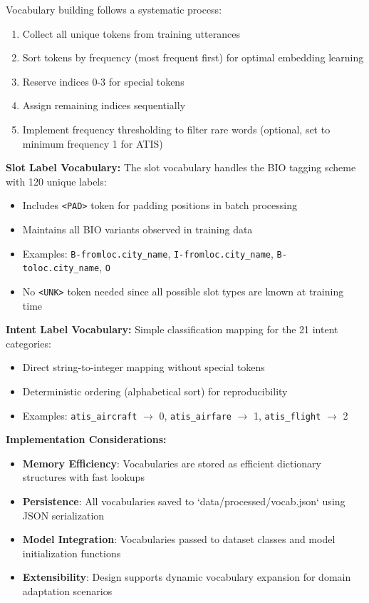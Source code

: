 \documentclass[conference]{IEEEtran}
\begin{document}
Vocabulary building follows a systematic process:
\begin{enumerate}
  \item Collect all unique tokens from training utterances
  \item Sort tokens by frequency (most frequent first) for optimal embedding learning
  \item Reserve indices 0-3 for special tokens
  \item Assign remaining indices sequentially
  \item Implement frequency thresholding to filter rare words (optional, set to minimum frequency 1 for ATIS)
\end{enumerate}

\textbf{Slot Label Vocabulary:}
The slot vocabulary handles the BIO tagging scheme with 120 unique labels:
\begin{itemize}
  \item Includes \texttt{<PAD>} token for padding positions in batch processing
  \item Maintains all BIO variants observed in training data
  \item Examples: \texttt{B-fromloc.city\_name}, \texttt{I-fromloc.city\_name}, \texttt{B-toloc.city\_name}, \texttt{O}
  \item No \texttt{<UNK>} token needed since all possible slot types are known at training time
\end{itemize}

\textbf{Intent Label Vocabulary:}
Simple classification mapping for the 21 intent categories:
\begin{itemize}
  \item Direct string-to-integer mapping without special tokens
  \item Deterministic ordering (alphabetical sort) for reproducibility
  \item Examples: \texttt{atis\_aircraft} $\to$ 0, \texttt{atis\_airfare} $\to$ 1, \texttt{atis\_flight} $\to$ 2
\end{itemize}

\textbf{Implementation Considerations:}
\begin{itemize}
  \item \textbf{Memory Efficiency}: Vocabularies are stored as efficient dictionary structures with fast lookups
  \item \textbf{Persistence}: All vocabularies saved to `data/processed/vocab.json` using JSON serialization
  \item \textbf{Model Integration}: Vocabularies passed to dataset classes and model initialization functions
  \item \textbf{Extensibility}: Design supports dynamic vocabulary expansion for domain adaptation scenarios
\end{itemize}
\end{document}
